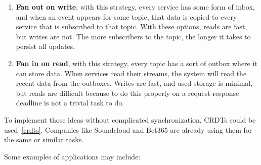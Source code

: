 \begin{enumerate}[start=1,label={(\bfseries \arabic*)}]
	\item \textbf{Fan out on write}, with this strategy, every service has some form of inbox, and when an event appears for some topic, that data is copied to every service that is subscribed to that topic. With these options, reads are fast, but writes are not. The more subscribers to the topic, the longer it takes to persist all updates. 
	\item \textbf{Fan in on read}, with this strategy, every topic has a sort of outbox where it can store data. When services read their streams, the system will read the recent data from the outboxes. Writes are fast, and used storage is minimal, but reads are difficult because to do this properly on a request-response deadline is not a trivial task to do.
\end{enumerate}

\noindent 
To implement those ideas without complicated synchronization, CRDTs could be used~\ref{crdts}. Companies like Soundcloud and Bet365 are already using them for the same or similar tasks.

Some examples of applications may include:

